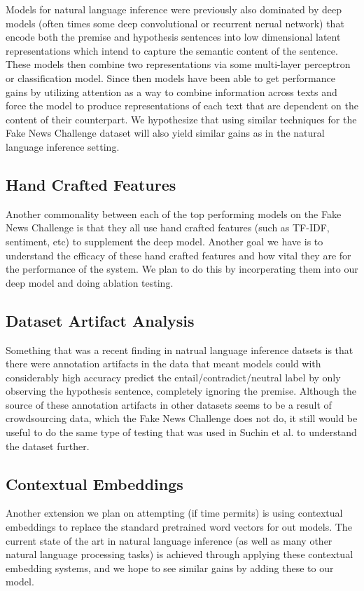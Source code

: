 \documentclass{article}
\begin{document}
Models for natural language inference were previously also dominated by deep models (often times
some deep convolutional or recurrent nerual network) that encode both the premise and hypothesis
sentences into low dimensional latent representations which intend to capture the semantic
content of the sentence. These models then combine two representations via some multi-layer
perceptron or classification model. Since then models have been able to get performance gains
by utilizing attention as a way to combine information across texts and force the model to
produce representations of each text that are dependent on the content of their counterpart.
We hypothesize that using similar techniques for the Fake News Challenge dataset will also
yield similar gains as in the natural language inference setting.

\subsection{Hand Crafted Features}
Another commonality between each of the top performing models on the Fake News Challenge
is that they all use hand crafted features (such as TF-IDF, sentiment, etc)
to supplement the deep model. Another goal we have is to understand the efficacy of these hand
crafted features and how vital they are for the performance of the system. We plan to do this
by incorperating them into our deep model and doing ablation testing.

\subsection{Dataset Artifact Analysis}
Something that was a recent finding in natrual language inference datsets is that there
were annotation artifacts in the data that meant models could with considerably high accuracy
predict the entail/contradict/neutral label by only observing the hypothesis sentence, completely
ignoring the premise. Although the source of these annotation artifacts in other datasets
seems to be a result of crowdsourcing data, which the Fake News Challenge does not do, it
still would be useful to do the same type of testing that was used in Suchin et al. to understand
the dataset further.

\subsection{Contextual Embeddings}
Another extension we plan on attempting (if time permits) is using contextual embeddings to
replace the standard pretrained word vectors for out models. The current state of the art in
natural language inference (as well as many other natural language processing tasks) is achieved
through applying these contextual embedding systems, and we hope to see similar gains by adding
these to our model.
\end{document}
